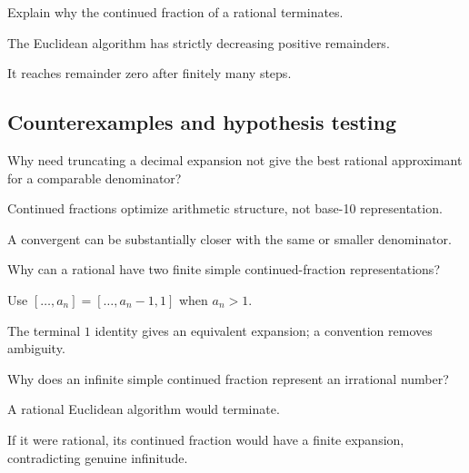 \begin{exercise}\label{exr:ii25-expand-09}
Explain why the continued fraction of a rational terminates.
\end{exercise}
\begin{hint}
The Euclidean algorithm has strictly decreasing positive remainders.
\end{hint}
\begin{solution}
It reaches remainder zero after finitely many steps.
\end{solution}

\subsection*{Counterexamples and hypothesis testing}

\begin{exercise}\label{exr:ii25-expand-10}
Why need truncating a decimal expansion not give the best rational approximant for a comparable denominator?
\end{exercise}
\begin{hint}
Continued fractions optimize arithmetic structure, not base-10 representation.
\end{hint}
\begin{solution}
A convergent can be substantially closer with the same or smaller denominator.
\end{solution}

\begin{exercise}\label{exr:ii25-expand-11}
Why can a rational have two finite simple continued-fraction representations?
\end{exercise}
\begin{hint}
Use \([\ldots,a_n]=[\ldots,a_n-1,1]\) when \(a_n>1\).
\end{hint}
\begin{solution}
The terminal \(1\) identity gives an equivalent expansion; a convention removes ambiguity.
\end{solution}

\begin{exercise}\label{exr:ii25-expand-12}
Why does an infinite simple continued fraction represent an irrational number?
\end{exercise}
\begin{hint}
A rational Euclidean algorithm would terminate.
\end{hint}
\begin{solution}
If it were rational, its continued fraction would have a finite expansion, contradicting genuine infinitude.
\end{solution}

